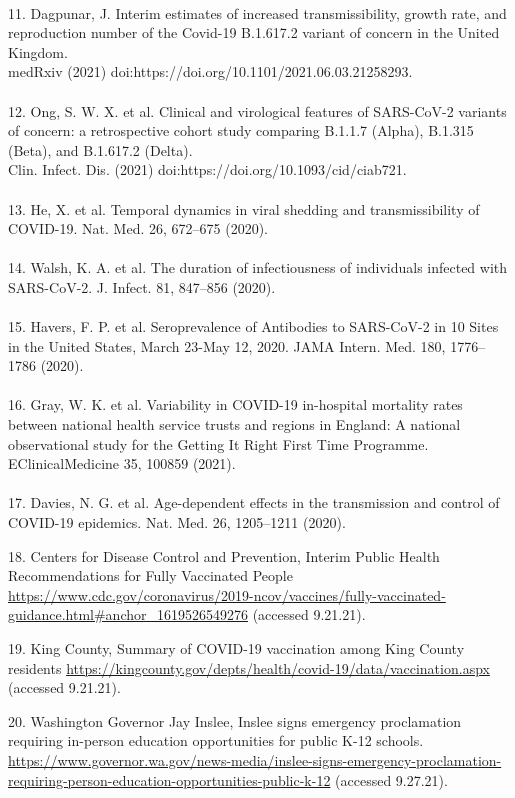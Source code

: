 \documentclass[11pt]{article}
\begin{document}
\\
11. {Dagpunar, J. Interim estimates of increased transmissibility, growth rate, and reproduction number of the Covid-19 B.1.617.2 variant of concern in the United Kingdom. \\
medRxiv (2021) doi:https://doi.org/10.1101/2021.06.03.21258293.}\\
\\
12. {Ong, S. W. X. et al. Clinical and virological features of SARS-CoV-2 variants of concern: a retrospective cohort study comparing B.1.1.7 (Alpha), B.1.315 (Beta), and B.1.617.2 (Delta). \\
Clin. Infect. Dis. (2021) doi:https://doi.org/10.1093/cid/ciab721. }\\
\\
13. {He, X. et al. Temporal dynamics in viral shedding and transmissibility of COVID-19. Nat. Med. 26, 672–675 (2020).}\\
\\
14. {Walsh, K. A. et al. The duration of infectiousness of individuals infected with SARS-CoV-2. J. Infect. 81, 847–856 (2020).}\\
\\
15. {Havers, F. P. et al. Seroprevalence of Antibodies to SARS-CoV-2 in 10 Sites in the United States, March 23-May 12, 2020. JAMA Intern. Med. 180, 1776–1786 (2020).}\\
\\
16. {Gray, W. K. et al. Variability in COVID-19 in-hospital mortality rates between national health service trusts and regions in England: A national observational study for the Getting It Right First Time Programme. EClinicalMedicine 35, 100859 (2021).}\\
\\
17. {Davies, N. G. et al. Age-dependent effects in the transmission and control of COVID-19 epidemics. Nat. Med. 26, 1205–1211 (2020).}

18. {Centers for Disease Control and Prevention, Interim Public Health Recommendations for Fully Vaccinated People \url{https://www.cdc.gov/coronavirus/2019-ncov/vaccines/fully-vaccinated-guidance.html#anchor_1619526549276} (accessed 9.21.21).} 
 
19. {King County, Summary of COVID-19 vaccination among King County residents \url{https://kingcounty.gov/depts/health/covid-19/data/vaccination.aspx} (accessed 9.21.21).} 

20. {Washington Governor Jay Inslee, Inslee signs emergency proclamation requiring in-person education opportunities for public K-12 schools.  \url{https://www.governor.wa.gov/news-media/inslee-signs-emergency-proclamation-requiring-person-education-opportunities-public-k-12} (accessed 9.27.21).} 
\end{document}
